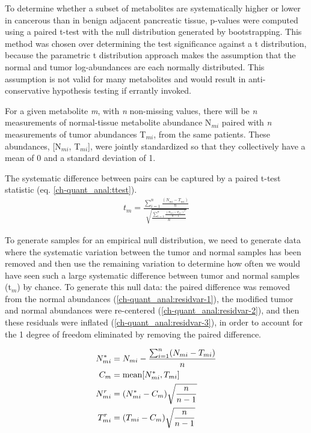 To determine whether a subset of metabolites are systematically higher or lower in cancerous than in benign adjacent pancreatic tissue, p-values were computed using a paired t-test with the null distribution generated by bootstrapping\cite{Efron:1986cv}.  This method was chosen over determining the test significance against a t distribution, because the parametric t distribution approach makes the assumption that the normal and tumor log-abundances are each normally distributed.  This assumption is not valid for many metabolites and would result in anti-conservative hypothesis testing if errantly invoked\cite{Schmoyeri:1996uh}.

For a given metabolite \textit{m}, with \textit{n} non-missing values, there will be \textit{n} measurements of normal-tissue metabolite abundance N$_{mi}$ paired with \textit{n} measurements of tumor abundances T$_{mi}$, from the same patients.  These abundances, [N$_{mi}$, T$_{mi}$], were jointly standardized so that they collectively have a mean of 0 and a standard deviation of 1.  

The systematic difference between pairs can be captured by a paired t-test statistic (eq. \ref{ch-quant_anal:ttest}). \vspace{3mm}
\begin{align}
t_{m} = \frac{\sum_{i = 1}^{n}\frac{(N_{mi} - T_{mi})}{n}}{\sqrt{\frac{\sum_{i = 1}^{n}\frac{(N_{mi} - T_{mi})^{2}}{n-1}}{n}}}\label{ch-quant_anal:ttest}
\end{align}

To generate samples for an empirical null distribution, we need to generate data where the systematic variation between the tumor and normal samples has been removed and then use the remaining variation to determine how often we would have seen such a large systematic difference between tumor and normal samples (t$_{m}$) by chance.  To generate this null data: the paired difference was removed from the normal abundances (\ref{ch-quant_anal:residvar-1}), the modified tumor and normal abundances were re-centered (\ref{ch-quant_anal:residvar-2}), and then these residuals were inflated (\ref{ch-quant_anal:residvar-3}), in order to account for the 1 degree of freedom eliminated by removing the paired difference.

\begin{subequations}
\begin{align}
N^{*}_{mi} &= N_{mi} - \frac{\sum_{i = 1}^{n}(N_{mi} - T_{mi})}{n}\label{ch-quant_anal:residvar-1}\\
C_{m} &= \text{mean}[N^{*}_{mi}, T_{mi}]\label{ch-quant_anal:residvar-2}\\
N^{r}_{mi} &= (N^{*}_{mi} - C_{m})\sqrt{\frac{n}{n - 1}}\notag\\
T^{r}_{mi} &= (T_{mi} - C_{m})\sqrt{\frac{n}{n - 1}}\label{ch-quant_anal:residvar-3}
\end{align}
\end{subequations}


